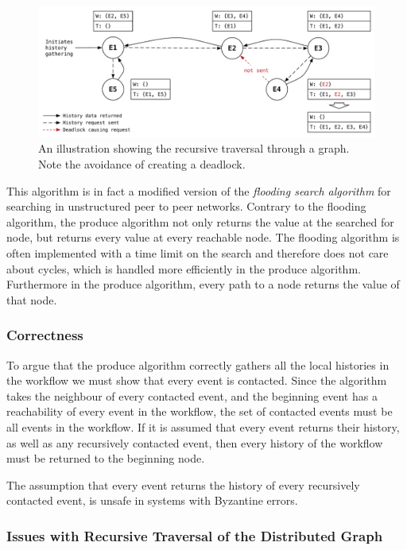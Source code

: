 	\begin{figure}[H]
		\centering
		\includegraphics[width=\textwidth]{4connect/images/recursive.pdf}
		\caption{An illustration showing the recursive traversal through a graph. Note the avoidance of creating a deadlock.}
		\label{fig:connecting:recursive}
	\end{figure}
		
	\newpar This algorithm is in fact a modified version of the \textit{flooding search algorithm}  for searching in unstructured peer to peer networks. Contrary to the flooding algorithm, the produce algorithm not only returns the value at the searched for node, but returns every value at every reachable node. The flooding algorithm is often implemented with a time limit on the search and therefore does not care about cycles, which is handled more efficiently in the produce algorithm. Furthermore in the produce algorithm, every path to a node returns the value of that node. 
	
	\subsubsection{Correctness}
	To argue that the produce algorithm correctly gathers all the local histories in the workflow we must show that every event is contacted. Since the algorithm takes the neighbour of every contacted event, and the beginning event has a reachability of every event in the workflow, the set of contacted events must be all events in the workflow. If it is assumed that every event returns their history, as well as any recursively contacted event, then every history of the workflow must be returned to the beginning node. 
	
	The assumption that every event returns the history of every recursively contacted event, is unsafe in systems with Byzantine errors.
	
	\subsubsection{Issues with Recursive Traversal of the Distributed Graph}
	
